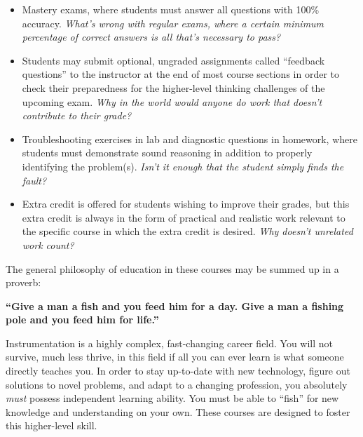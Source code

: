 \begin{itemize}
\vskip 20pt
\item{} Mastery exams, where students must answer all questions with 100\% accuracy.  {\it What's wrong with regular exams, where a certain minimum percentage of correct answers is all that's necessary to pass?}
\vskip 20pt
\item{} Students may submit optional, ungraded assignments called ``feedback questions'' to the instructor at the end of most course sections in order to check their preparedness for the higher-level thinking challenges of the upcoming exam.  {\it Why in the world would anyone do work that doesn't contribute to their grade?}
\vskip 20pt
\item{} Troubleshooting exercises in lab and diagnostic questions in homework, where students must demonstrate sound reasoning in addition to properly identifying the problem(s).  {\it Isn't it enough that the student simply finds the fault?}
\vskip 20pt
\item{} Extra credit is offered for students wishing to improve their grades, but this extra credit is always in the form of practical and realistic work relevant to the specific course in which the extra credit is desired.  {\it Why doesn't unrelated work count?}
\end{itemize}







The general philosophy of education in these courses may be summed up in a proverb: 

\vskip 10pt

{\bf ``Give a man a fish and you feed him for a day.  Give a man a fishing pole and you feed him for life.''}

\vskip 10pt

Instrumentation is a highly complex, fast-changing career field.  You will not survive, much less thrive, in this field if all you can ever learn is what someone directly teaches you.  In order to stay up-to-date with new technology, figure out solutions to novel problems, and adapt to a changing profession, you absolutely {\it must} possess independent learning ability.  You must be able to ``fish'' for new knowledge and understanding on your own.  These courses are designed to foster this higher-level skill.










